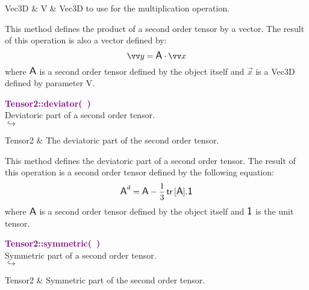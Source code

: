 \begin{tcolorbox}[width=\textwidth,myArgs,tabularx={ll|R}]
Vec3D & V & Vec3D to use for the multiplication operation.
\end{tcolorbox}

This method defines the product of a second order tensor by a vector.
The result of this operation is also a vector defined by:
\begin{equation*}
\overrightarrow{y} = \A \cdot \overrightarrow{x}
\end{equation*}
where $\mbox{\large\ensuremath{\mathsf{A}}}$ is a second order tensor defined by the object itself and $\overrightarrow{x}$ is a Vec3D defined by parameter V.

\textcolor{purple}{\textbf{Tensor2::deviator(~)}}\label{Tensor2::deviator()}\\
Deviatoric part of a second order tensor.\\ \hspace*{5mm}$\hookrightarrow$
\vspace*{-2em}\begin{tcolorbox}[grow to left by=-1cm, width=\textwidth-1cm,myArgs,tabularx={l|R}]
Tensor2 & The deviatoric part of the second order tensor.
\end{tcolorbox}

This method defines the deviatoric part of a second order tensor.
The result of this operation is a second order tensor defined by the following equation:
\begin{equation*}
\mbox{\large\ensuremath{\mathsf{A}}}^d=\mbox{\large\ensuremath{\mathsf{A}}}-\frac{1}{3}\mbox{\ensuremath{\mathsf{\,tr\,}}}[\mbox{\large\ensuremath{\mathsf{A}}}].\mbox{\large\ensuremath{\mathsf{1}}}
\end{equation*}
where $\mbox{\large\ensuremath{\mathsf{A}}}$ is a second order tensor defined by the object itself and $\mbox{\large\ensuremath{\mathsf{1}}}$ is the unit tensor.

\textcolor{purple}{\textbf{Tensor2::symmetric(~)}}\label{Tensor2::symmetric()}\\
Symmetric part of a second order tensor.\\ \hspace*{5mm}$\hookrightarrow$
\vspace*{-2em}\begin{tcolorbox}[grow to left by=-1cm, width=\textwidth-1cm,myArgs,tabularx={l|R}]
Tensor2 & Symmetric part of the second order tensor.
\end{tcolorbox}

